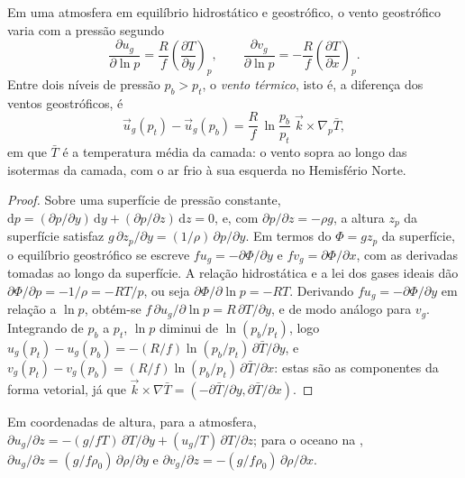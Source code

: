 \begin{theorem}\label{thm:b3:gfd-foundations:thermal-wind}
Em uma atmosfera em equilíbrio hidrostático e geostrófico, o vento geostrófico
varia com a pressão segundo
\[
\frac{\partial u_g}{\partial\ln p} = \frac{R}{f}\left(\frac{\partial T}{\partial y}\right)_p ,
\qquad
\frac{\partial v_g}{\partial\ln p} = -\frac{R}{f}\left(\frac{\partial T}{\partial x}\right)_p .
\]
Entre dois níveis de pressão $p_b > p_t$, o \emph{vento
térmico}, isto é, a diferença dos ventos geostróficos, é
\[
\vec u_g(p_t) - \vec u_g(p_b) = \frac{R}{f}\,\ln\frac{p_b}{p_t}\;\vec k\times\nabla_p\bar T ,
\]
em que $\bar T$ é a temperatura média da camada: o vento sopra ao longo das
isotermas da camada, com o ar frio à sua esquerda no
Hemisfério Norte.
\end{theorem}

\begin{proof}
Sobre uma superfície de pressão constante, $\mathrm dp = (\partial p/\partial y)
\,\mathrm dy + (\partial p/\partial z)\,\mathrm dz = 0$, e, com
$\partial p/\partial z = -\rho g$, a altura $z_p$ da superfície satisfaz
$g\,\partial z_p/\partial y = (1/\rho)\,\partial p/\partial y$. Em termos do
 $\Phi = gz_p$ da superfície, o equilíbrio geostrófico se escreve
$fu_g = -\partial\Phi/\partial y$ e $fv_g = \partial\Phi/\partial x$, com
as derivadas tomadas ao longo da superfície. A relação hidrostática e a
lei dos gases ideais dão $\partial\Phi/\partial p = -1/\rho = -RT/p$, ou seja
$\partial\Phi/\partial\ln p = -RT$. Derivando $fu_g =
-\partial\Phi/\partial y$ em relação a $\ln p$, obtém-se $f\,\partial
u_g/\partial\ln p = R\,\partial T/\partial y$, e de modo análogo para $v_g$.
Integrando de $p_b$ a $p_t$, $\ln p$ diminui de $\ln(p_b/p_t)$, logo
$u_g(p_t) - u_g(p_b) = -(R/f)\ln(p_b/p_t)\,\partial\bar T/\partial y$, e
$v_g(p_t) - v_g(p_b) = (R/f)\ln(p_b/p_t)\,\partial\bar T/\partial x$: estas
são as componentes da forma vetorial, já que $\vec k\times\nabla\bar T =
(-\partial\bar T/\partial y, \partial\bar T/\partial x)$.
\end{proof}

\begin{corollary}\label{cor:b3:gfd-foundations:thermal-wind-z}
Em coordenadas de altura, para a atmosfera, $\partial u_g/\partial z =
-(g/fT)\,\partial T/\partial y + (u_g/T)\,\partial T/\partial z$; para o
oceano na , $\partial u_g/\partial z =
(g/f\rho_0)\,\partial\rho/\partial y$ e $\partial v_g/\partial z =
-(g/f\rho_0)\,\partial\rho/\partial x$.
\end{corollary}

